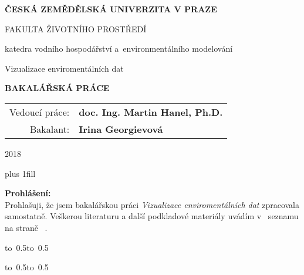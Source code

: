 \documentclass[12pt,a4paper]{report}
\begin{document}


\pagestyle{empty}
\begin{center}

\large

{ \bf ČESKÁ ZEMĚDĚLSKÁ UNIVERZITA V PRAZE}

\medskip

FAKULTA ŽIVOTNÍHO PROSTŘEDÍ

\medskip

{\sc \Large katedra vodního hospodářství a~environmentálního modelování}

\vfill

\vfill

{\LARGE Vizualizace enviromentálních dat}

\vspace{2mm}

{\bf \Large BAKALÁŘSKÁ PRÁCE}

\vspace{15mm}

\vfill

\vfill

\begin{tabular}{rl}

\noalign{\vspace{2mm}}
Vedoucí práce: & \bf doc. Ing. Martin Hanel, Ph.D. \\
\noalign{\vspace{2mm}}
Bakalant: & \bf Irina Georgievová \\
\end{tabular}

\vfill

2018

\end{center}
\newpage

\newpage


\vglue 0pt plus 1fill

\noindent
{\bfseries Prohlášení:} \\
Prohlašuji, že jsem bakalářskou práci \emph{Vizualizace enviromentálních dat} zpracovala samostatně. Veškerou literaturu a další podkladové materiály uvádím v~ seznamu na straně ~\pageref{literatura}.

\vspace{10mm}

\hbox{\hbox to 0.5\hbox to 0.5}

\vspace{1mm}
\hbox{\hbox to 0.5\hsize{%

\hss}\hbox to 0.5}
\end{document}
